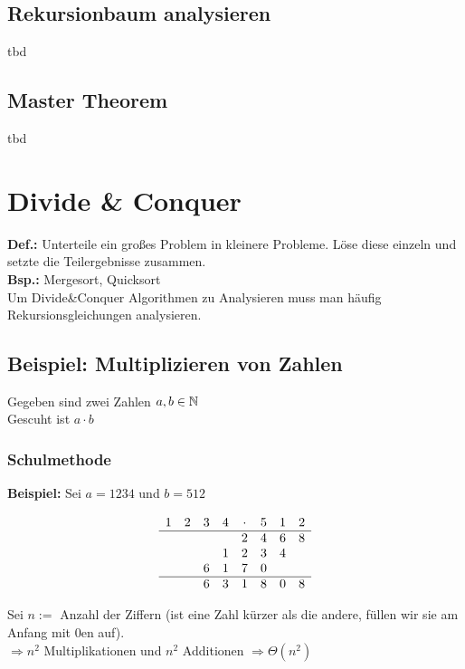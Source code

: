\subsection{Rekursionbaum analysieren}

tbd

\subsection{Master Theorem}

tbd

\section{Divide \& Conquer}

\textbf{Def.:} Unterteile ein großes Problem in kleinere Probleme. Löse diese einzeln und setzte die Teilergebnisse zusammen.\\

\textbf{Bsp.:} Mergesort, Quicksort\\

Um Divide\&Conquer Algorithmen zu Analysieren muss man häufig Rekursionsgleichungen analysieren.

\subsection{Beispiel: Multiplizieren von Zahlen}

Gegeben sind zwei Zahlen $a,b \in \mathbb{N}$\\
Gescuht ist $ a \cdot b$

\subsubsection{Schulmethode}

\textbf{Beispiel:} Sei $a=1234$ und $b = 512$

$$
\begin{array}{cccccccc}
1 & 2 & 3 & 4 & \cdot & 5 & 1 & 2\\
\hline
&&&&2&4&6&8\\
&&&1&2&3&4&\\
&&6&1&7&0&&\\
\hline
&&6&3&1&8&0&8
\end{array}
$$

Sei $n := $ Anzahl der Ziffern (ist eine Zahl kürzer als die andere, füllen wir sie am Anfang mit 0en auf).\\
$\Rightarrow n^2$ Multiplikationen und $n^2$ Additionen $\Rightarrow \Theta (n^2)$\\

